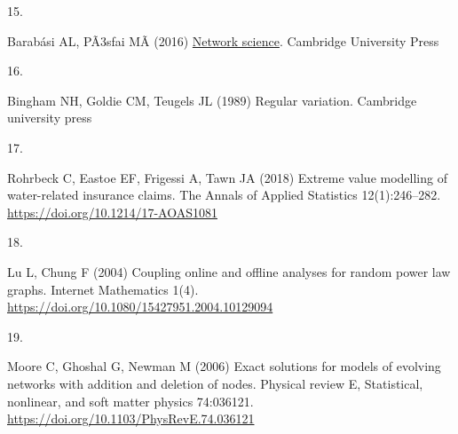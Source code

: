 \documentclass[
  10pt,
  a4paper,
]{scrreprt}
\newlength{\cslhangindent}
\newlength{\csllabelwidth}
\newlength{\cslentryspacingunit} %
\newenvironment{CSLReferences}[2] %
 {%
  \setlength{\parindent}{0pt}
  \ifodd #1
  \let\oldpar\par
  \def\par{\hangindent=\cslhangindent\oldpar}
  \fi
  \setlength{\parskip}{#2\cslentryspacingunit}
 }%
 {}
\newcommand{\CSLLeftMargin}[1]{\parbox[t]{\csllabelwidth}{#1}}
\newcommand{\CSLRightInline}[1]{\parbox[t]{\linewidth - \csllabelwidth}{#1}\break}
\theoremstyle{definition}
\theoremstyle{plain}
\theoremstyle{plain}
\theoremstyle{remark}
\begin{document}
{\begin{CSLReferences}{0}{0}
\leavevmode{}%
\CSLLeftMargin{15. }%
\CSLRightInline{Barabási AL, PÃ3sfai MÃ (2016)
\href{https://books.google.co.uk/books?id=iLtGDQAAQBAJ}{Network
science}. Cambridge University Press}

\leavevmode{}%
\CSLLeftMargin{16. }%
\CSLRightInline{Bingham NH, Goldie CM, Teugels JL (1989) Regular
variation. Cambridge university press}

\leavevmode{}%
\CSLLeftMargin{17. }%
\CSLRightInline{Rohrbeck C, Eastoe EF, Frigessi A, Tawn JA (2018)
{Extreme value modelling of water-related insurance claims}. The Annals
of Applied Statistics 12(1):246--282.
\url{https://doi.org/10.1214/17-AOAS1081}}

\leavevmode{}%
\CSLLeftMargin{18. }%
\CSLRightInline{Lu L, Chung F (2004) Coupling online and offline
analyses for random power law graphs. Internet Mathematics 1(4).
\url{https://doi.org/10.1080/15427951.2004.10129094}}

\leavevmode{}%
\CSLLeftMargin{19. }%
\CSLRightInline{Moore C, Ghoshal G, Newman M (2006) Exact solutions for
models of evolving networks with addition and deletion of nodes.
Physical review E, Statistical, nonlinear, and soft matter physics
74:036121. \url{https://doi.org/10.1103/PhysRevE.74.036121}}

\end{CSLReferences}
\end{document}
